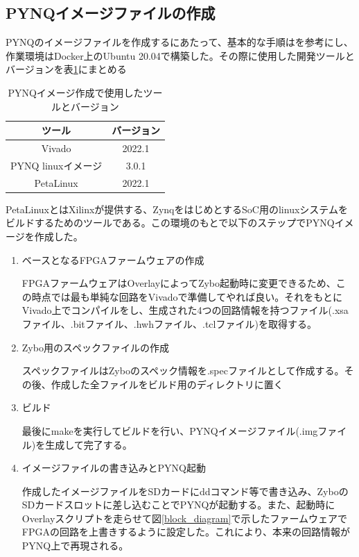 \subsection{PYNQイメージファイルの作成}

PYNQのイメージファイルを作成するにあたって、基本的な手順は\cite{image}を参考にし、作業環境はDocker上のUbuntu 20.04で構築した。その際に使用した開発ツールとバージョンを表\ref{PYNQ_table}にまとめる

\begin{table}[htbp]
  \centering
  \caption{PYNQイメージ作成で使用したツールとバージョン}
  \vspace{3mm}
  \begin{tabular}{cc} \hline
    ツール & バージョン \\ \hline
    Vivado & 2022.1\\
    PYNQ linuxイメージ & 3.0.1\\
    PetaLinux & 2022.1\\ \hline
  \end{tabular}
  \label{PYNQ_table}
\end{table}

PetaLinuxとはXilinxが提供する、ZynqをはじめとするSoC用のlinuxシステムをビルドするためのツールである。この環境のもとで以下のステップでPYNQイメージを作成した。
\begin{enumerate}
  \item ベースとなるFPGAファームウェアの作成

  FPGAファームウェアはOverlayによってZybo起動時に変更できるため、この時点では最も単純な回路をVivadoで準備してやれば良い。それをもとにVivado上でコンパイルをし、生成された4つの回路情報を持つファイル(.xsaファイル、.bitファイル、.hwhファイル、.tclファイル)を取得する。
  \item Zybo用のスペックファイルの作成

  スペックファイルはZyboのスペック情報を.specファイルとして作成する。その後、作成した全ファイルをビルド用のディレクトリに置く
  \item ビルド

  最後にmakeを実行してビルドを行い、PYNQイメージファイル(.imgファイル)を生成して完了する。
  \item イメージファイルの書き込みとPYNQ起動

  作成したイメージファイルをSDカードにddコマンド等で書き込み、ZyboのSDカードスロットに差し込むことでPYNQが起動する。また、起動時にOverlayスクリプトを走らせて図\ref{block_diagram}で示したファームウェアでFPGAの回路を上書きするように設定した。これにより、本来の回路情報がPYNQ上で再現される。

\end{enumerate}

